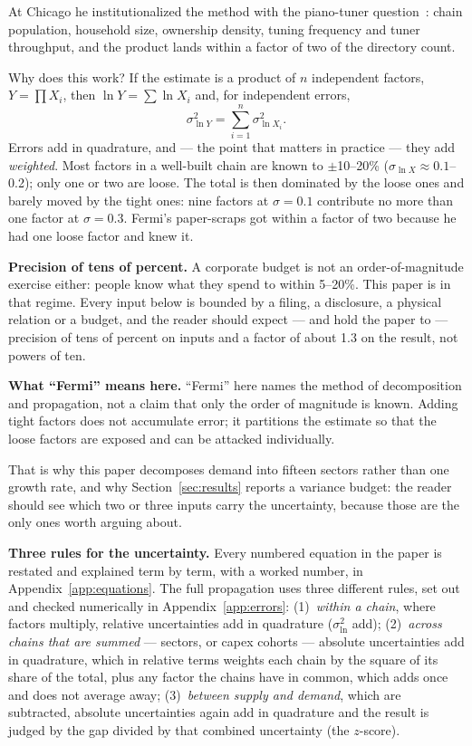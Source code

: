 \documentclass[11pt,letterpaper]{article}
\newcommand{\lead}[1]{{\color{leadwarm}\sffamily\bfseries #1}}
\begin{document}
At Chicago he institutionalized the method with the piano-tuner question~\cite{ref:morrison1963,ref:vonbaeyer1993}: chain population, household size, ownership density, tuning frequency and tuner throughput, and the product lands within a factor of two of the directory count.

Why does this work? If the estimate is a product of $n$ independent factors, $Y=\prod X_i$, then $\ln Y=\sum\ln X_i$ and, for independent errors,
\begin{equation}
\sigma_{\ln Y}^{2}=\sum_{i=1}^{n}\sigma_{\ln X_i}^{2}.
\label{eq:var}
\end{equation}
Errors add in quadrature, and --- the point that matters in practice --- they add \emph{weighted}. Most factors in a well-built chain are known to $\pm$10--20\% ($\sigma_{\ln X}\approx0.1$--0.2); only one or two are loose. The total is then dominated by the loose ones and barely moved by the tight ones: nine factors at $\sigma=0.1$ contribute no more than one factor at $\sigma=0.3$. Fermi's paper-scraps got within a factor of two because he had one loose factor and knew it.

\lead{Precision of tens of percent.} A corporate budget is not an order-of-magnitude exercise either: people know what they spend to within 5--20\%. This paper is in that regime. Every input below is bounded by a filing, a disclosure, a physical relation or a budget, and the reader should expect --- and hold the paper to --- precision of tens of percent on inputs and a factor of about 1.3 on the result, not powers of ten.

\lead{What ``Fermi'' means here.} ``Fermi'' here names the method of decomposition and propagation, not a claim that only the order of magnitude is known. Adding tight factors does not accumulate error; it partitions the estimate so that the loose factors are exposed and can be attacked individually.

That is why this paper decomposes demand into fifteen sectors rather than one growth rate, and why Section~\ref{sec:results} reports a variance budget: the reader should see which two or three inputs carry the uncertainty, because those are the only ones worth arguing about.

\lead{Three rules for the uncertainty.} Every numbered equation in the paper is restated and explained term by term, with a worked number, in Appendix~\ref{app:equations}. The full propagation uses three different rules, set out and checked numerically in Appendix~\ref{app:errors}: (1)~\emph{within a chain}, where factors multiply, relative uncertainties add in quadrature ($\sigma^2_{\ln}$ add); (2)~\emph{across chains that are summed} --- sectors, or capex cohorts --- absolute uncertainties add in quadrature, which in relative terms weights each chain by the square of its share of the total, plus any factor the chains have in common, which adds once and does not average away; (3)~\emph{between supply and demand}, which are subtracted, absolute uncertainties again add in quadrature and the result is judged by the gap divided by that combined uncertainty (the $z$-score).
\end{document}
